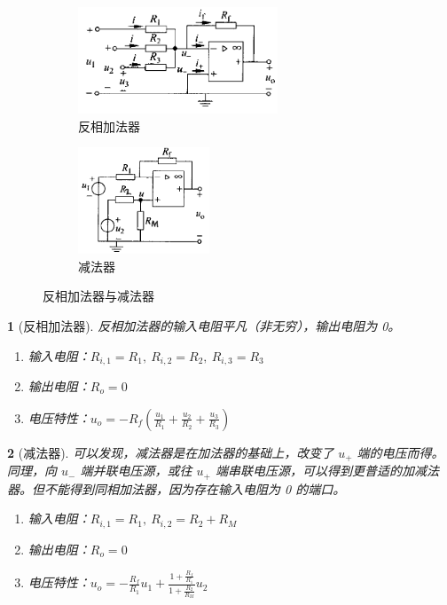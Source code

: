 \documentclass[UTF8]{report}
\theoremstyle{MyLineTheoremStyle} %
\theoremstyle{MyBlockTheoremStyle} %
\theoremstyle{MySubsubsectionStyle} %
\newtheorem{definition}{}
\begin{document}
\begin{figure}[H]\centering
    \begin{subfigure}[t]{0.37\textwidth}\centering
        \includegraphics[height=90pt]{assets/1,2/反相加法器.png}
        \caption{ 反相加法器}
    \end{subfigure}\begin{subfigure}[t]{0.37\textwidth}\centering
        \includegraphics[height=90pt]{assets/1,2/减法器.png}
        \caption{ 减法器}
    \end{subfigure}
    \caption{ 反相加法器与减法器}
\end{figure}


\begin{definition}[反相加法器]
反相加法器的输入电阻平凡（非无穷），输出电阻为 0。
\begin{enumerate}
\item 输入电阻：$R_{i,1} = R_1,\ R_{i,2} = R_2,\ R_{i,3} = R_3$
\item 输出电阻：$R_o = 0$
\item 电压特性：$u_o = - R_f\left( \frac{u_1}{R_1} + \frac{u_2}{R_2} + \frac{u_3}{R_3} \right) $
\end{enumerate}
\end{definition}


\begin{definition}[减法器]
可以发现，减法器是在加法器的基础上，改变了 $u_+$ 端的电压而得。同理，向 $u_-$ 端并联电压源，或往 $u_+$ 端串联电压源，可以得到更普适的加减法器。但不能得到同相加法器，因为存在输入电阻为 0 的端口。
\begin{enumerate}
\item 输入电阻：$R_{i,1} = R_1,\ R_{i,2} = R_2 + R_M$
\item 输出电阻：$R_o = 0$
\item 电压特性：$u_o = -\frac{R_f}{R_1}u_1 + \frac{1+\frac{R_f}{R_1}}{1+\frac{R_2}{R_M}}u_2 $
\end{enumerate}
\end{definition}
\end{document}
